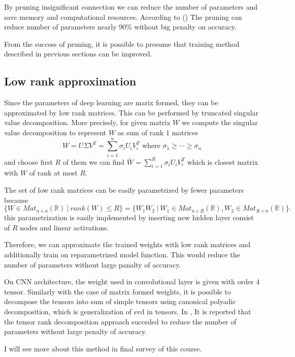 \documentclass[11pt]{article}
\begin{document}
	By pruning insignificant connection we can reduce the number of parameters and save memory and computational resources. According to (\cite{han2015deep}) The pruning can reduce number of parameters nearly 90\% without big penalty on accuracy.

	From the success of pruning, it is possible to presume that training method described in previous sections can be improved.

	\subsection{Low rank approximation}
	Since the parameters of deep learning are marix formed, they can be approximated by low rank matrices. This can be performed by truncated singular value decomposition. More precisely, for given matrix $W$ we compute the singular value decomposition to represent $W$ as sum of rank 1 matrices
	\begin{equation*}
		W=U\Sigma V^T=\sum_{i=1}^{n}\sigma_i U_iV_i^T\mbox{ where } \sigma_1\geq\cdots\geq\sigma_n
	\end{equation*}
	and choose first $R$ of them we can find $\bar{W}=\sum_{i=1}^R\sigma_i U_iV_i^T$ which is closest matrix with $W$ of rank at most $R$.

	The set of low rank matrices can be easily parametrized by fewer parameters because
	\begin{equation*}
		\{W\in Mat_{n\times n}(\mathbb{R})~|~rank(W)\leq R\}=\{W_1W_2~|~W_1\in Mat_{n\times R}(\mathbb{R}),W_2\in Mat_{R\times n}(\mathbb{R})\}.
	\end{equation*}
	this parametrization is easily implemented by inserting new hidden layer consist of $R$ nodes and linear activations.

	Therefore, we can approximate the trained weights with low rank matrices and additionally train on reparametrized model function. This would reduce the number of parameters without large panalty of accuracy.

	On CNN architecture, the weight used in convolutional layer is given with order 4 tensor. Similarly with the case of matrix formed weights, it is possible to decompose the tensors into sum of simple tensors using canonical polyadic decomposition, which is generalization of svd in tensors. In \cite{cheng2017survey}, It is reported that the tensor rank decomposition approach succeded to reduce the number of parameters without large penalty of accuracy.
	
	I will see more about this method in final survey of this course.
	\nocite{alpaydin2020introduction}
	
	
\end{document}
